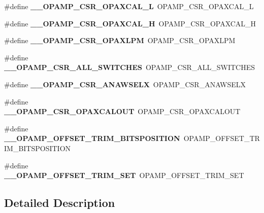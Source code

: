 \begin{DoxyCompactItemize}
\mbox{\label{group___h_a_l___o_p_a_m_p___aliased___macros_ga476dfa7349959c398e971c4e96e656ad}} 
\#define {\bfseries \+\_\+\+\_\+\+O\+P\+A\+M\+P\+\_\+\+C\+S\+R\+\_\+\+O\+P\+A\+X\+C\+A\+L\+\_\+L}~O\+P\+A\+M\+P\+\_\+\+C\+S\+R\+\_\+\+O\+P\+A\+X\+C\+A\+L\+\_\+L
\item 
\mbox{\label{group___h_a_l___o_p_a_m_p___aliased___macros_ga0fec50091b520af8698fddad86932f0d}} 
\#define {\bfseries \+\_\+\+\_\+\+O\+P\+A\+M\+P\+\_\+\+C\+S\+R\+\_\+\+O\+P\+A\+X\+C\+A\+L\+\_\+H}~O\+P\+A\+M\+P\+\_\+\+C\+S\+R\+\_\+\+O\+P\+A\+X\+C\+A\+L\+\_\+H
\item 
\mbox{\label{group___h_a_l___o_p_a_m_p___aliased___macros_gad32527d90ee52b1a01ca9d4708d49546}} 
\#define {\bfseries \+\_\+\+\_\+\+O\+P\+A\+M\+P\+\_\+\+C\+S\+R\+\_\+\+O\+P\+A\+X\+L\+PM}~O\+P\+A\+M\+P\+\_\+\+C\+S\+R\+\_\+\+O\+P\+A\+X\+L\+PM
\item 
\mbox{\label{group___h_a_l___o_p_a_m_p___aliased___macros_ga8baa137838166f683fe84ba887fbaae2}} 
\#define {\bfseries \+\_\+\+\_\+\+O\+P\+A\+M\+P\+\_\+\+C\+S\+R\+\_\+\+A\+L\+L\+\_\+\+S\+W\+I\+T\+C\+H\+ES}~O\+P\+A\+M\+P\+\_\+\+C\+S\+R\+\_\+\+A\+L\+L\+\_\+\+S\+W\+I\+T\+C\+H\+ES
\item 
\mbox{\label{group___h_a_l___o_p_a_m_p___aliased___macros_ga7eabece68a39d88bbd36c17dda9da7dc}} 
\#define {\bfseries \+\_\+\+\_\+\+O\+P\+A\+M\+P\+\_\+\+C\+S\+R\+\_\+\+A\+N\+A\+W\+S\+E\+LX}~O\+P\+A\+M\+P\+\_\+\+C\+S\+R\+\_\+\+A\+N\+A\+W\+S\+E\+LX
\item 
\mbox{\label{group___h_a_l___o_p_a_m_p___aliased___macros_ga07a3019c291d8ee540821dec9c5a2bd0}} 
\#define {\bfseries \+\_\+\+\_\+\+O\+P\+A\+M\+P\+\_\+\+C\+S\+R\+\_\+\+O\+P\+A\+X\+C\+A\+L\+O\+UT}~O\+P\+A\+M\+P\+\_\+\+C\+S\+R\+\_\+\+O\+P\+A\+X\+C\+A\+L\+O\+UT
\item 
\mbox{\label{group___h_a_l___o_p_a_m_p___aliased___macros_ga45a1e3e121f1289a77b4f43b91d050aa}} 
\#define {\bfseries \+\_\+\+\_\+\+O\+P\+A\+M\+P\+\_\+\+O\+F\+F\+S\+E\+T\+\_\+\+T\+R\+I\+M\+\_\+\+B\+I\+T\+S\+P\+O\+S\+I\+T\+I\+ON}~O\+P\+A\+M\+P\+\_\+\+O\+F\+F\+S\+E\+T\+\_\+\+T\+R\+I\+M\+\_\+\+B\+I\+T\+S\+P\+O\+S\+I\+T\+I\+ON
\item 
\mbox{\label{group___h_a_l___o_p_a_m_p___aliased___macros_ga1b8216e44e3f38a0c394d4451fae1255}} 
\#define {\bfseries \+\_\+\+\_\+\+O\+P\+A\+M\+P\+\_\+\+O\+F\+F\+S\+E\+T\+\_\+\+T\+R\+I\+M\+\_\+\+S\+ET}~O\+P\+A\+M\+P\+\_\+\+O\+F\+F\+S\+E\+T\+\_\+\+T\+R\+I\+M\+\_\+\+S\+ET
\end{DoxyCompactItemize}


\subsection{Detailed Description}
